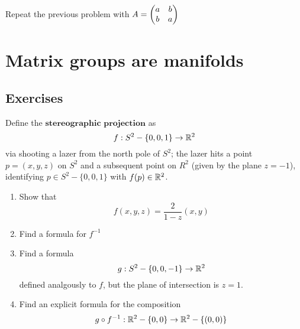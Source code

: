 \documentclass[12pt]{book}
\theoremstyle{definition}
\begin{document}
\begin{taggedexercise}[TODO]
  Repeat the previous problem with $A = \begin{pmatrix} a & b \\ b & a \end{pmatrix}$
\end{taggedexercise}

\begin{taggedexercise}[TODO]
  
\end{taggedexercise}

\begin{taggedexercise}[TODO]
  
\end{taggedexercise}

\begin{taggedexercise}[TODO]
  
\end{taggedexercise}

\begin{taggedexercise}[TODO]
  
\end{taggedexercise}

\chapter{Matrix groups are manifolds}
\section{Exercises}

\begin{taggedexercise}[Complete]
  Define the $\textbf{stereographic projection}$ as 
  \[
  f: S^2 - \{0,0,1\} \to \mathbb{R}^2
  \]
  via shooting a lazer from the north pole of $S^2$; the lazer hits a point $p = (x,y,z)$ on $S^2$ and a subsequent point on $R^2$ (given by the plane $z = -1$), identifying $p \in S^2 - \{0,0,1\}$ with $f(p) \in \mathbb{R}^2$.
  \begin{enumerate}
    \item Show that \[f(x,y,z) = \frac{2}{1-z}(x,y)\]
    \item Find a formula for $f^{-1}$
    \item Find a formula \[g: S^2 - \{0,0,-1\} \to \mathbb{R}^2\] defined analgously to $f$, but the plane of intersection is $z=1$.
    \item Find an explicit formula for the composition \[g \circ f^{-1} : \mathbb{R}^2 - \{0,0\} \to \mathbb{R}^2 - \{(0,0)\}\]
  \end{enumerate}
\end{taggedexercise}
\end{document}
